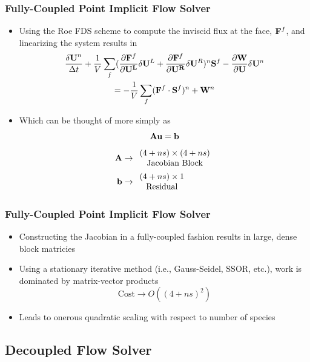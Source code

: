 \documentclass{beamer}
\begin{document}
\begin{frame}
  \frametitle{Fully-Coupled Point Implicit Flow Solver}
  \begin{itemize}
  \item Using the Roe FDS scheme to compute the inviscid flux at the face,
    $\mathbf F^f$, and linearizing the system results in
  \begin{multline*}
  	\frac{\mathbf{\delta U}^n}{\Delta t}
    +\frac{1}{V}\sum\limits_{f}(\frac{\partial \mathbf F^f}
    {\partial \mathbf{U^L}}\delta\mathbf U^L
  	+\frac{\partial \mathbf F^f}{\partial \mathbf{U^R}}\delta\mathbf U^R)^n \mathbf S^f
  	- \frac{\partial \mathbf W}{\partial \mathbf U}\delta\mathbf U^n \\
  	= -\frac{1}{V}\sum\limits_{f}(\mathbf F^f\cdot\mathbf S^f)^n + \mathbf W^n
  \end {multline*}
  \item Which can be thought of more simply as
  \[
    \mathbf A\mathbf u = \mathbf b
  \]
  \vspace{-0.7cm}
  \begin{align*}
    \mathbf A &\to
    \begin{array}{c}
      (4+ns) \times (4+ns) \\
      \text{Jacobian Block}
    \end{array} \\
    \mathbf b &\to
    \begin{array}{c}
      (4+ns) \times 1 \\
      \text{Residual}
    \end{array}
  \end{align*}
  \end{itemize}
\end{frame}
\begin{frame}
  \frametitle{Fully-Coupled Point Implicit Flow Solver}
  \begin{itemize}
    \item Constructing the Jacobian in a fully-coupled fashion results in large,
      dense block matricies
    \item Using a stationary iterative method (i.e., Gauss-Seidel, SSOR, etc.),
      work is dominated by matrix-vector products
      \[
        \text{Cost} \to O((4+ns)^2)
      \]
    \item Leads to onerous quadratic scaling with respect to number of species
  \end{itemize}
\end{frame}

\subsection{Decoupled Flow Solver}
\end{document}
